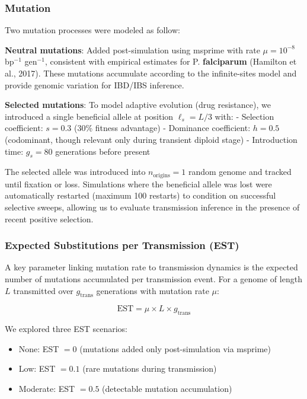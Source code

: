 \documentclass[
  11pt,
]{article}
\providecommand{\tightlist}{%
  \setlength{\itemsep}{0pt}\setlength{\parskip}{0pt}}
\begin{document}
\subsubsection{Mutation}\label{mutation}

Two mutation processes were modeled as follow:

\textbf{Neutral mutations}: Added post-simulation using msprime with
rate \(\mu = 10^{-8}\) bp\(^{-1}\) gen\(^{-1}\), consistent with
empirical estimates for P. \textbf{falciparum} (Hamilton et al., 2017).
These mutations accumulate according to the infinite-sites model and
provide genomic variation for IBD/IBS inference.

\textbf{Selected mutations}: To model adaptive evolution (drug
resistance), we introduced a single beneficial allele at position
\(\ell_s = L/3\) with: - Selection coefficient: \(s = 0.3\) (30\%
fitness advantage) - Dominance coefficient: \(h = 0.5\) (codominant,
though relevant only during transient diploid stage) - Introduction
time: \(g_s = 80\) generations before present

The selected allele was introduced into \(n_{\text{origins}} = 1\)
random genome and tracked until fixation or loss. Simulations where the
beneficial allele was lost were automatically restarted (maximum 100
restarts) to condition on successful selective sweeps, allowing us to
evaluate transmission inference in the presence of recent positive
selection.

\subsubsection{Expected Substitutions per Transmission
(EST)}\label{expected-substitutions-per-transmission-est}

A key parameter linking mutation rate to transmission dynamics is the
expected number of mutations accumulated per transmission event. For a
genome of length \(L\) transmitted over \(g_{\text{trans}}\) generations
with mutation rate \(\mu\):

\[\text{EST} = \mu \times L \times g_{\text{trans}}\]

We explored three EST scenarios:

\begin{itemize}
\tightlist
\item
  None: EST \(= 0\) (mutations added only post-simulation via msprime)
\item
  Low: EST \(= 0.1\) (rare mutations during transmission)
\item
  Moderate: EST \(= 0.5\) (detectable mutation accumulation)
\end{itemize}
\end{document}
